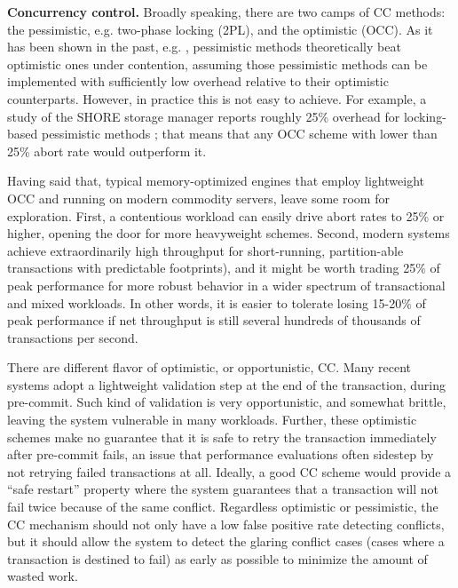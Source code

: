\vspace{2mm} 
{\bf Concurrency control.} 
Broadly speaking, there are two camps of CC methods: the pessimistic, e.g. two-phase locking (2PL), and the optimistic (OCC). As it has been shown in the past, e.g. \cite{AgrawalCL87}, pessimistic methods theoretically beat optimistic ones under contention, assuming those pessimistic methods can be implemented with sufficiently low overhead relative to their optimistic counterparts. However, in practice this is not easy to achieve. For example, a study of the SHORE storage manager reports roughly 25\% overhead for locking-based pessimistic methods \cite{HarizopoulosAMS08}; that means that any OCC scheme with lower than 25\% abort rate would outperform it.

Having said that, typical memory-optimized engines that employ lightweight OCC and running on modern commodity servers, leave some room for exploration. First, a contentious workload can easily drive abort rates to 25\% or higher, opening the door for more heavyweight schemes. Second, modern systems achieve extraordinarily high throughput for short-running, partition-able transactions with predictable footprints), and it might be worth trading 25\% of peak performance for more robust behavior in a wider spectrum of transactional and mixed workloads. In other words, it is easier to tolerate losing 15-20\% of peak performance if net throughput is still several hundreds of thousands of transactions per second.


There are different flavor of optimistic, or opportunistic, CC. Many recent systems adopt a lightweight validation step at the end of the transaction, during pre-commit. Such kind of validation is very opportunistic, and somewhat brittle, leaving the system vulnerable in many workloads.
Further, these optimistic schemes make no guarantee that it is safe to retry the transaction immediately after pre-commit fails, an issue that performance evaluations often sidestep by not retrying failed transactions at all. Ideally, a good CC scheme would provide a ``safe restart'' property \cite{PortsG12} where the system guarantees that a transaction will not fail twice because of the same conflict.
Regardless optimistic or pessimistic, the CC mechanism should not only have a low false positive rate detecting conflicts, but it should allow the system to detect the glaring conflict cases (cases where a transaction is destined to fail) as early as possible to minimize the amount of wasted work.

